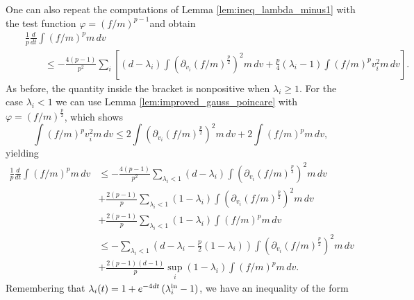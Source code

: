 \documentclass[11pt]{amsart}
\numberwithin{equation}{section}
\begin{document}
One can also repeat the computations of Lemma \ref{lem:ineq_lambda_minus1} with the test function $\varphi = (f/m)^{p-1}$and obtain
\begin{eqnarray*}
  &&\frac{1}{p}\frac{d}{dt}\int(f/m)^{p}m\,dv\\
  &&\qquad\leq-\frac{4(p-1)}{p^{2}}\sum_{i}\left[(d-\lambda_{i})\int\left(\partial_{v_{i}}(f/m)^{\frac{p}{2}}\right)^{2}m\,dv+\frac{p}{4}(\lambda_{i}-1)\int(f/m)^{p}v_{i}^{2}m\,dv\right].
\end{eqnarray*}
As before, the quantity inside the bracket is nonpositive when $\lambda_{i}\geq1$.
For the case $\lambda_{i}<1$ we can use Lemma \ref{lem:improved_gauss_poincare} with $\varphi=(f/m)^{\frac{p}{2}}$, which shows
\[
\int(f/m)^{p}v_{i}^{2}m\,dv\leq 2\int\left(\partial_{v_{i}}(f/m)^{\frac{p}{2}}\right)^{2}m\,dv+2\int(f/m)^{p}m\,dv,
\]
yielding
\begin{align*}
  \frac{1}{p}\frac{d}{dt}\int(f/m)^{p}m\,dv &
  \leq-\frac{4(p-1)}{p^{2}}\sum_{\lambda_{i}<1}(d-\lambda_{i})\int\left(\partial_{v_{i}}(f/m)^{\frac{p}{2}}\right)^{2}m\,dv	\\
  & +\frac{2(p-1)}{p}\sum_{\lambda_{i}<1}(1-\lambda_{i})\int\left(\partial_{v_{i}}(f/m)^{\frac{p}{2}}\right)^{2}m\,dv\\
  &+\frac{2(p-1)}{p}\sum_{\lambda_{i}<1}(1-\lambda_{i})\int(f/m)^{p}m\,dv\\
  & \leq-\sum_{\lambda_{i}<1}\left(d-\lambda_{i}-\frac{p}{2}(1-\lambda_{i})\right)\int\left(\partial_{v_{i}}(f/m)^{\frac{p}{2}}\right)^{2}m\,dv\\
  & +\frac{2(p-1)(d-1)}{p}\sup_{i}(1-\lambda_{i})\int(f/m)^{p}m\,dv.
\end{align*}
% 
Remembering that $\lambda_{i}(t)=1+e^{-4dt}\left(\lambda_{i}^{\textnormal{in}}-1\right)$, we have an inequality of the form
\end{document}
